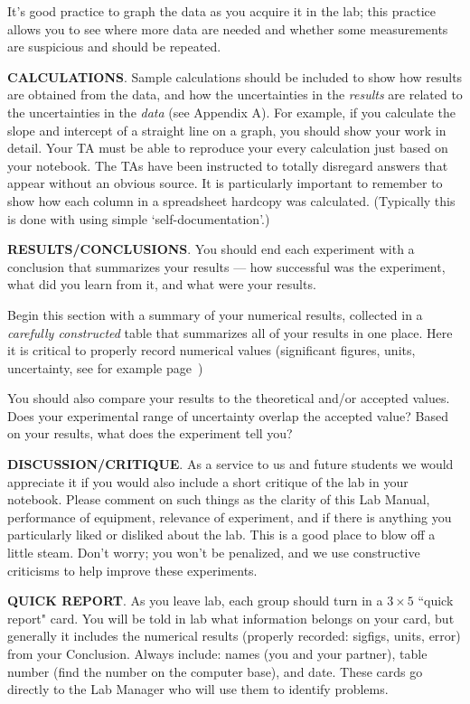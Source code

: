 \begin{description}
It's good practice to graph the data as you acquire
it in the lab; this practice allows you to see where more data are
needed
and whether some measurements are suspicious and should be repeated.

\item {\bf CALCULATIONS}.  Sample calculations should be included to
show how results are obtained from the data, and how the uncertainties
in the {\em results} are related to the uncertainties in the {\em
data} (see Appendix A).  For example, if you calculate the slope and
intercept of a straight line on a graph, you should show your work
in detail.  Your TA must be able to reproduce your every calculation
just based on your notebook.  The TAs have been instructed to
totally disregard answers that appear without an obvious source.
It is particularly important to remember to show how each column in a
spreadsheet hardcopy was calculated.  (Typically this is done with
using simple `self-documentation'.)

\item {\bf RESULTS/CONCLUSIONS}. You should end each experiment with a conclusion that
summarizes your results --- how successful was the experiment, what did
you learn from it, and what were your results.

Begin this section with a
summary of your numerical results, collected in a {\em carefully constructed}
table that summarizes all of your results in one place. 
Here it is critical to properly record numerical values
(significant figures, units, uncertainty, see for example page~\pageref{appa:sigfigs})

You should also compare your results to the theoretical and/or
accepted values.
Does your experimental range of uncertainty overlap the accepted value?
Based on your results, what does the experiment tell you?

\item {\bf DISCUSSION/CRITIQUE}.
As a service to us and future students we would appreciate it if you
would also include a short critique of the lab in your notebook.
  Please
comment on such things as the clarity of this Lab Manual, performance
of equipment, relevance of experiment, and if there is anything you
particularly liked or disliked about the lab.  This is a good place to
blow off a little steam.  Don't worry; you won't be penalized, and we
use constructive criticisms to help improve these experiments.

\item {\bf QUICK REPORT}.
\label{par:quick.report}
As you leave lab, each group should turn in a $3\times5$ ``quick report" card.
You will be told in lab what information belongs on your card, but generally
it includes the numerical results (properly recorded: sigfigs, units, error)
from your Conclusion.  Always include: names (you and your partner), table number
(find the number on the computer base), and date.
These cards go directly to the Lab Manager who will use them to
identify problems.

\end{description}


